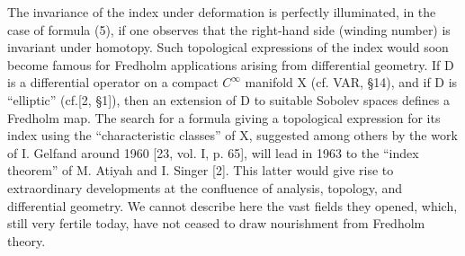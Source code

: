 The invariance of the index under deformation is perfectly illuminated, in the case of formula (5), if one observes that the right-hand side (winding number) is invariant under homotopy. Such topological expressions of the index would soon become famous for Fredholm applications arising from differential geometry. If D is a differential operator on a compact \(C^{\infty}\) manifold X (cf. VAR, §14), and if D is “elliptic” (cf.{[}2, §1{]}), then an extension of D to suitable Sobolev spaces defines a Fredholm map. The search for a formula giving a topological expression for its index using the “characteristic classes” of X, suggested among others by the work of I. Gelfand around 1960 {[}23, vol. I, p. 65{]}, will lead in 1963 to the “index theorem” of M. Atiyah and I. Singer {[}2{]}. This latter would give rise to extraordinary developments at the confluence of analysis, topology, and differential geometry. We cannot describe here the vast fields they opened, which, still very fertile today, have not ceased to draw nourishment from Fredholm theory.

